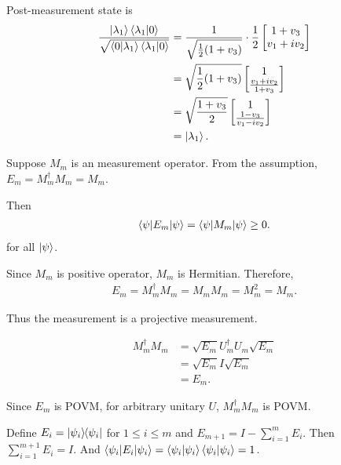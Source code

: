 Post-measurement state is
\begin{align*}
	\frac{\ket{\lambda_1} \braket{\lambda_1 | 0}}{ \sqrt{\braket{0 | \lambda_1} \braket{\lambda_1 | 0}} } &= \frac{1}{\sqrt{\frac{1}{2} (1 + v_3)}}
	\cdot \frac{1}{2}
	\begin{bmatrix}
		1 + v_3 \\ 
		v_1 + iv_2
	\end{bmatrix} \\
		&= \sqrt{ \frac{1}{2}  (1 + v_3) } \begin{bmatrix}
		1 \\ 
		\frac{v_1 + iv_2}{1+v_3}
		\end{bmatrix} \\
		&=  \sqrt{ \frac{1 + v_3}{2} } \begin{bmatrix}
		1 \\ 
		\frac{1 - v_3}{v_1 - iv_2}
		\end{bmatrix} \\
		&= \ket{\lambda_1}.
\end{align*}




Suppose $M_m$ is an measurement operator.
From the assumption, $E_m = M_m^\dagger M_m = M_m$.

Then
\begin{align*}
    \braket{\psi | E_m | \psi} = \braket{\psi | M_m | \psi} \geq 0.
\end{align*}
for all $\ket{\psi}$.

Since $M_m$ is positive operator, $M_m$ is Hermitian.
Therefore,
\begin{align*}
    E_m = M_m^\dagger M_m = M_m M_m = M_m^2 = M_m.
\end{align*}

Thus the measurement is a projective measurement.



\begin{align*}
    M_m^\dagger M_m &= \sqrt{E_m} U_m^\dagger U_m \sqrt{E_m}\\
        &= \sqrt{E_m} I \sqrt{E_m}\\
        &= E_m.
\end{align*}
 
Since $E_m$ is POVM,  for arbitrary  unitary $U$, $M_m^\dagger M_m$ is POVM.




Define $E_i = \ket{\psi_i}\hspace{-1mm} \bra{\psi_i}$ for $1 \leq i \leq m$ and $E_{m+1} = I - \sum_{i=1}^{m} E_i$. Then $\sum_{i=1}^{m+1} E_i = I$.
And $\braket{\psi_i | E_i | \psi_i} = \braket{\psi_i | \psi_i} \braket{\psi_i | \psi_i} = 1$.



